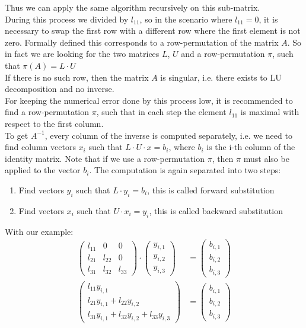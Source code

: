 Thus we can apply the same algorithm recursively on this sub-matrix.
\vspace{0.3cm}\\
During this process we divided by $l_{11}$, so in the scenario where $l_{11}=0$, it is necessary to swap the first row with a different row where the first element is not zero. Formally defined this corresponds to a row-permutation of the matrix $A$. So in fact we are looking for the two matrices $L$, $U$ and a row-permutation $\pi$, such that $\pi(A) = L \cdot U$\\  
If there is no such row, then the matrix $A$ is singular, i.e. there exists to LU decomposition and no inverse. \\
For keeping the numerical error done by this process low, it is recommended to find a row-permutation $\pi$, such that in each step the element $l_{11}$ is maximal with respect to the first column.
\vspace{0.3cm}\\
To get $A^{-1}$, every column of the inverse is computed separately, i.e. we need to find column vectors $x_i$ such that $L \cdot U \cdot x = b_i$, where $b_i$ is the i-th column of the identity matrix. Note that if we use a row-permutation $\pi$, then $\pi$ must also be applied to the vector $b_i$. The computation is again separated into two steps:\\
\begin{enumerate}
	\item Find vectors $y_i$ such that $L \cdot y_i = b_i$, this is called forward substitution
	\item Find vectors $x_i$ such that $U \cdot x_i = y_i$, this is called backward substitution
\end{enumerate}
With our example:
\begin{align*}
	\begin{pmatrix} l_{11}  & 0 & 0\\
	l_{21} & l_{22} & 0\\
	l_{31} & l_{32} & l_{33}
	\end{pmatrix} \cdot \begin{pmatrix} y_{i,1} \\ y_{i,2} \\ y_{i,3}	\end{pmatrix}
	& = \begin{pmatrix}
	b_{i,1} \\ b_{i,2} \\ b_{i,3}
	\end{pmatrix} \\
	\begin{pmatrix}
	l_{11} y_{i,1}\\ l_{21} y_{i,1} + l_{22} y_{i,2}\\
	l_{31} y_{i,1} + l_{32} y_{i,2} + l_{33} y_{i,3}
	\end{pmatrix}	& = \begin{pmatrix}
	b_{i,1} \\ b_{i,2} \\ b_{i,3}
	\end{pmatrix} \\
\end{align*}
